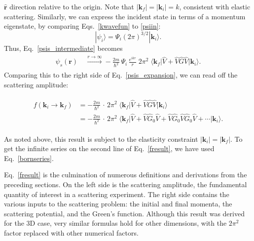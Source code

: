 \documentclass[prx,12pt]{revtex4-2}
\begin{document}
$\hat{\mathbf{r}}$ direction relative to the origin.  Note that
$|\mathbf{k}_f| = |\mathbf{k}_i| = k$, consistent with elastic
scattering.  Similarly, we can express the incident state in terms of
a momentum eigenstate, by comparing Eqs.~\eqref{kwavefun} to
\eqref{psiin}:
\begin{equation}
  |\psi_i\rangle = \Psi_i (2\pi)^{3/2} |\mathbf{k}_i\rangle.  
\end{equation}
Thus, Eq.~\eqref{psis_intermediate} becomes
\begin{align}
  \begin{aligned}\psi_s(\mathbf{r}) \; &\overset{r\rightarrow\infty}{\longrightarrow} - \frac{2m}{\hbar^2} \, \Psi_i\, \frac{e^{ikr}}{r} \; 2\pi^2 \; \big\langle \mathbf{k}_f \big|\hat{V} + \hat{V}\hat{G}\hat{V}\big|\mathbf{k}_i\big\rangle.\end{aligned}
\end{align}
Comparing this to the right side of Eq.~\eqref{psis_expansion}, we can
read off the scattering amplitude:
\begin{framed}
  \begin{align}
    \begin{aligned}
      f(\mathbf{k}_i \rightarrow \mathbf{k}_f) &= - \frac{2m}{\hbar^2} \,\cdot \, 2\pi^2 \; \big\langle \mathbf{k}_f\big| \hat{V} + \hat{V}\hat{G} \hat{V} \big|\mathbf{k}_i\big\rangle \\
      &= - \frac{2m}{\hbar^2} \,\cdot \, 2\pi^2 \; \big\langle \mathbf{k}_f\big| \hat{V} + \hat{V}\hat{G}_0 \hat{V} + \hat{V} \hat{G}_0 \hat{V} \hat{G}_0\hat{V} + \cdots \big|\mathbf{k}_i\big\rangle.  \end{aligned}
    \label{fresult}
  \end{align}
\end{framed}
\vskip -0.15in
\noindent
As noted above, this result is subject to the elasticity constraint
$|\mathbf{k}_i| = |\mathbf{k}_f|$.  To get the infinite series on the
second line of Eq.~\eqref{fresult}, we have used
Eq.~\eqref{bornseries}.

Eq.~\eqref{fresult} is the culmination of numerous definitions and
derivations from the preceding sections.  On the left side is the
scattering amplitude, the fundamental quantity of interest in a
scattering experiment.  The right side contains the various inputs to
the scattering problem: the initial and final momenta, the scattering
potential, and the Green's function.  Although this result was derived
for the 3D case, very similar formulas hold for other dimensions, with
the $2\pi^2$ factor replaced with other numerical factors.
\end{document}
